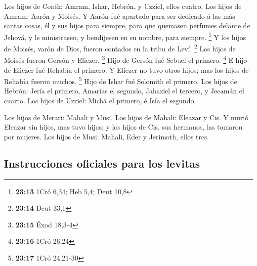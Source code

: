  Los hijos de Coath: Amram, Ishar, Hebrón, y Uzziel, ellos
cuatro.  Los hijos de Amram: Aarón y Moisés. Y Aarón fué
apartado para ser dedicado á las más santas cosas, él y sus hijos para
siempre, para que quemasen perfumes delante de Jehová, y le ministrasen,
y bendijesen en su nombre, para siempre. \footnote{\textbf{23:13} 1Cró
  6,34; Heb 5,4; Deut 10,8}  Y los hijos de Moisés, varón
de Dios, fueron contados en la tribu de Leví. \footnote{\textbf{23:14}
  Deut 33,1}  Los hijos de Moisés fueron Gersón y Eliezer.
\footnote{\textbf{23:15} Éxod 18,3-4}  Hijo de Gersón fué
Sebuel el primero. \footnote{\textbf{23:16} 1Cró 26,24}  E
hijo de Eliezer fué Rehabía el primero. Y Eliezer no tuvo otros hijos;
mas los hijos de Rehabía fueron muchos. \footnote{\textbf{23:17} 1Cró
  24,21-30}  Hijo de Ishar fué Selomith el primero.
 Los hijos de Hebrón: Jería el primero, Amarías el segundo,
Jahaziel el tercero, y Jecamán el cuarto.  Los hijos de
Uzziel: Michâ el primero, é Isía el segundo.

 Los hijos de Merari: Mahali y Musi. Los hijos de Mahali:
Eleazar y Cis.  Y murió Eleazar sin hijos, mas tuvo hijas;
y los hijos de Cis, sus hermanos, las tomaron por mujeres. 
Los hijos de Musi: Mahali, Eder y Jerimoth, ellos tres.

\hypertarget{instrucciones-oficiales-para-los-levitas}{%
\subsection{Instrucciones oficiales para los
levitas}\label{instrucciones-oficiales-para-los-levitas}}

